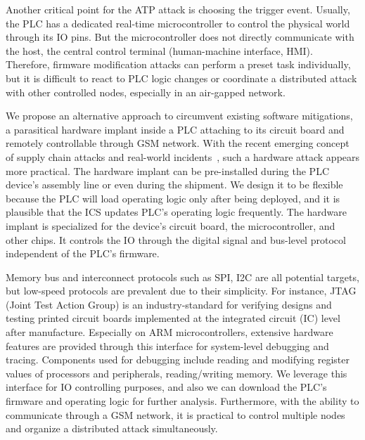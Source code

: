 Another critical point for the ATP attack is choosing the trigger event. Usually, the PLC has a dedicated real-time microcontroller to control the physical world through its IO pins. But the microcontroller does not directly communicate with the host, the central control terminal (human-machine interface, HMI). Therefore, firmware modification attacks can perform a preset task individually, but it is difficult to react to PLC logic changes or coordinate a distributed attack with other controlled nodes, especially in an air-gapped network.

We propose an alternative approach to circumvent existing software mitigations, a parasitical hardware implant inside a PLC attaching to its circuit board and remotely controllable through GSM network.  With the recent emerging concept of supply chain attacks and real-world incidents~\cite{oxfordsolarwinds}, such a hardware attack appears more practical. The hardware implant can be pre-installed during the PLC device's assembly line or even during the shipment. We design it to be flexible because the PLC will load operating logic only after being deployed, and it is plausible that the ICS updates PLC's operating logic frequently. The hardware implant is specialized for the device's circuit board, the microcontroller, and other chips.  It controls the IO through the digital signal and bus-level protocol independent of the PLC's firmware.

Memory bus and interconnect protocols such as SPI, I2C are all potential targets, but low-speed protocols are prevalent due to their simplicity. For instance, JTAG (Joint Test Action Group) is an industry-standard for verifying designs and testing printed circuit boards implemented at the integrated circuit (IC) level after manufacture. Especially on ARM microcontrollers, extensive hardware features are provided through this interface for system-level debugging and tracing. Components used for debugging include reading and modifying register values of processors and peripherals, reading/writing memory. We leverage this interface for IO controlling purposes, and also we can download the PLC's firmware and operating logic for further analysis. Furthermore, with the ability to communicate through a GSM network, it is practical to control multiple nodes and organize a distributed attack simultaneously.


